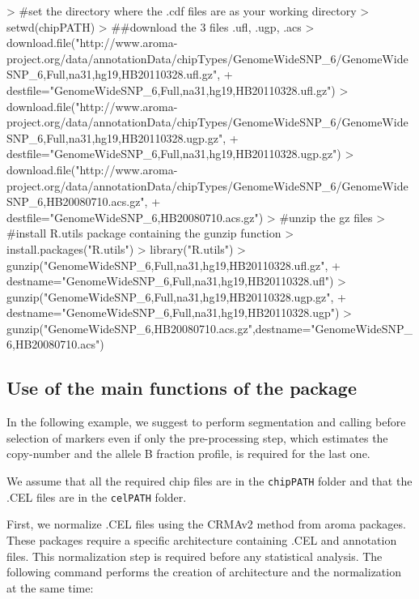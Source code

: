\documentclass[a4paper,10pt]{article}
\begin{document}
			\begin{scriptsize}
\begin{Schunk}
\begin{Sinput}
> #set the directory where the .cdf files are as your working directory 
> setwd(chipPATH) 	
> ##download the 3 files .ufl, .ugp, .acs
> download.file("http://www.aroma-project.org/data/annotationData/chipTypes/GenomeWideSNP_6/GenomeWideSNP_6,Full,na31,hg19,HB20110328.ufl.gz",
+ destfile="GenomeWideSNP_6,Full,na31,hg19,HB20110328.ufl.gz")
> download.file("http://www.aroma-project.org/data/annotationData/chipTypes/GenomeWideSNP_6/GenomeWideSNP_6,Full,na31,hg19,HB20110328.ugp.gz",
+ destfile="GenomeWideSNP_6,Full,na31,hg19,HB20110328.ugp.gz")
> download.file("http://www.aroma-project.org/data/annotationData/chipTypes/GenomeWideSNP_6/GenomeWideSNP_6,HB20080710.acs.gz", 
+ destfile="GenomeWideSNP_6,HB20080710.acs.gz")
> #unzip the gz files
> #install R.utils package containing the gunzip function
> install.packages("R.utils")
> library("R.utils")
> gunzip("GenomeWideSNP_6,Full,na31,hg19,HB20110328.ufl.gz",
+ destname="GenomeWideSNP_6,Full,na31,hg19,HB20110328.ufl")
> gunzip("GenomeWideSNP_6,Full,na31,hg19,HB20110328.ugp.gz",
+ destname="GenomeWideSNP_6,Full,na31,hg19,HB20110328.ugp")
> gunzip("GenomeWideSNP_6,HB20080710.acs.gz",destname="GenomeWideSNP_6,HB20080710.acs")
\end{Sinput}
\end{Schunk}
			\end{scriptsize}


		\subsection{Use of the main functions of the package}	
			\label{mainuse}
        		In the following example, we suggest to perform segmentation and calling before selection of markers even if only the pre-processing step, which estimates the copy-number and the allele B fraction profile, is required for the last one.

        		We assume that all the required chip files are in the \texttt{chipPATH} folder and that the .CEL files are in the \texttt{celPATH} folder.


			First, we normalize .CEL files using the CRMAv2 method \cite{CRMAv2} from aroma packages. These packages require a specific architecture containing .CEL and annotation files. This normalization step is required before any statistical analysis. The following command performs the creation of architecture and the normalization at the same time:
			
\end{document}
